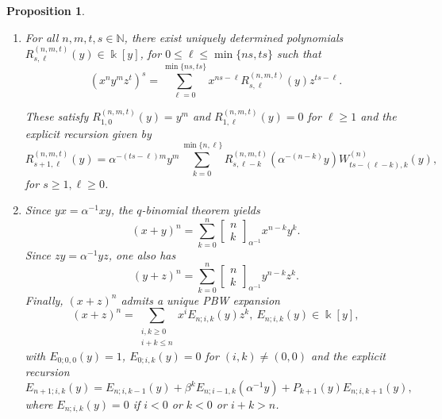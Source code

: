 \documentclass{amsart}
\newtheorem{proposition}[theorem]{Proposition}
\theoremstyle{definition}
\theoremstyle{remark}
\numberwithin{equation}{section}
\begin{document}
\begin{proposition}
\begin{enumerate}
\item [\rm (4)] For all $n,m,t,s\in\mathbb{N}$, there exist uniquely determined polynomials $R^{(n,m,t)}_{s,\ell}(y)\in\Bbbk[y]$, for $0\le \ell\le \min\{ns,ts\}$ such that
\begin{equation}\label{Rdefalpha3i}
(x^n y^m z^t)^s=\sum_{\ell=0}^{\min\{ns,ts\}} x^{ns-\ell}R^{(n,m,t)}_{s,\ell}(y)z^{ts-\ell}.
\end{equation}

These satisfy $R^{(n,m,t)}_{1,0}(y)=y^m$ and $R^{(n,m,t)}_{1,\ell}(y)=0$ for $\ell\ge 1$ and the explicit recursion given by
\begin{equation}\label{Rrecalpha3i}
R^{(n,m,t)}_{s+1,\ell}(y)=\alpha^{-(ts-\ell)m}y^{m}\sum_{k=0}^{\min\{n,\ell\}}R^{(n,m,t)}_{s,\ell-k}(\alpha^{-(n-k)}y)
W^{(n)}_{ts-(\ell-k),k}(y),
\end{equation}
for $s\ge 1, \ell\ge 0$.

\item[\rm (5)] Since $yx=\alpha^{-1}xy$, the $q$-binomial theorem yields
\[
(x+y)^n=\sum_{k=0}^{n}\begin{bmatrix} n\\ k\end{bmatrix}_{\alpha^{-1}}x^{n-k}y^{k}.
\]
Since $zy=\alpha^{-1}yz$, one also has
\[
(y+z)^n=\sum_{k=0}^{n}\begin{bmatrix} n\\ k\end{bmatrix}_{\alpha^{-1}}y^{n-k}z^{k}.
\]
Finally, $(x+z)^n$ admits a unique PBW expansion
\begin{equation}\label{Edefalpha3i}
(x+z)^n=\sum_{\substack{i,k\ge 0\\ i+k\le n}} x^{i}E_{n;i,k}(y)z^{k},
\ E_{n;i,k}(y)\in\Bbbk[y],
\end{equation}
with $E_{0;0,0}(y)=1$, $E_{0;i,k}(y)=0$ for $(i,k)\neq(0,0)$ and the explicit recursion
\begin{equation}\label{Erecalpha3i}
E_{n+1;i,k}(y)=E_{n;i,k-1}(y)+\beta^{k}E_{n;i-1,k}(\alpha^{-1}y) + P_{k+1}(y)E_{n;i,k+1}(y),
\end{equation}
where $E_{n;i,k}(y)=0$ if $i<0$ or $k<0$ or $i+k>n$.
\end{enumerate}
\end{proposition}
\end{document}
